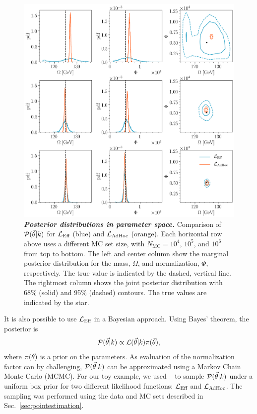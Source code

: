 \begin{figure}[ht]
\centering
    \includegraphics[width=1\linewidth]{fig/fig6}
\caption{\textbf{\textit{Posterior distributions in parameter space.}} Comparison of $\mathcal{P}(\vec{\theta}|k)$ for $\mathcal{L}_\textmd{Eff}$ (blue) and $\mathcal{L}_{\textmd{AdHoc}}$ (orange).
Each horizontal row above uses a different MC set size, with $N_\mathrm{MC}=10^4$, $10^5$, and $10^6$ from top to bottom.
The left and center column show the marginal posterior distribution for the mass, $\Omega$, and normalization, $\Phi$, respectively.
The true value is indicated by the dashed, vertical line.
The rightmost column shows the joint posterior distribution with 68\% (solid) and 95\% (dashed) contours.
The true values are indicated by the star.}
\label{fig:llhdist}
\end{figure}

It is also possible to use $\mathcal{L}_\textmd{Eff}$ in a Bayesian approach.
Using Bayes' theorem, the posterior is
\begin{equation}
\mathcal{P}(\vec{\theta}|k) \propto \mathcal{L}(\vec{\theta}|k) \pi(\vec{\theta}),
\end{equation}
where $\pi(\vec{\theta})$ is a prior on the parameters.
As evaluation of the normalization factor can by challenging, $\mathcal{P}(\vec{\theta}|k)$ can be approximated using a Markov Chain Monte Carlo (MCMC).
For our toy example, we used \emcee{}~\cite{ForemanMackey:2012ig} to sample $\mathcal{P}(\vec{\theta}|k)$ under a uniform box prior for two different likelihood functions: $\mathcal{L}_\textmd{Eff}$ and $\mathcal{L}_{\textmd{AdHoc}}$.
The sampling was performed using the data and MC sets described in Sec.~\ref{sec:pointestimation}.


